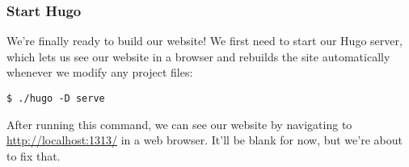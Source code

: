 \begin{frame}[fragile]
    \frametitle{Start Hugo}

    We're finally ready to build our website! We first need to start our Hugo server, which lets us see our website
    in a browser and rebuilds the site automatically whenever we modify any project files:

    \vfill

    \begin{lstlisting}[style=saneCode,gobble=8]
        $ ./hugo -D serve
    \end{lstlisting}

    \vfill

    After running this command, we can see our website by navigating to \url{http://localhost:1313/} in a web
    browser. It'll be blank for now, but we're about to fix that.
\end{frame}